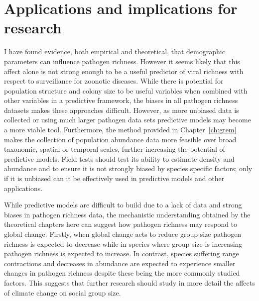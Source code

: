 




\section{Applications and implications for research}

I have found evidence, both empirical and theoretical, that demographic parameters can influence pathogen richness.
However it seems likely that this affect alone is not strong enough to be a useful predictor of viral richness with respect to surveillance for zoonotic diseases.
While there is potential for population structure and colony size to be useful variables when combined with other variables in a predictive framework, the biases in all pathogen richness datasets makes these approaches difficult.
However, as more unbiased data is collected \cite{anthony2013strategy, anthony2015non} or using much larger pathogen data sets \cite{wardeh2015database} predictive models may become a more viable tool.
Furthermore, the method provided in Chapter~\ref{ch:grem} makes the collection of population abundance data more feasible over broad taxonomic, spatial or temporal scales, further increasing the potential of predictive models.
Field tests should test its ability to estimate density and abundance and to ensure it is not strongly biased by species specific factors; only if it is unbiased can it be effectively used in predictive models and other applications.

While predictive models are difficult to build due to a lack of data and strong biases in pathogen richness data, the mechanistic understanding obtained by the theoretical chapters here can suggest how pathogen richness may respond to global change.
Firstly, when global change acts to reduce group size \cite{lehmann2010apes, zunino2007habitat, manor2003impact, atwood2006influence} pathogen richness is expected to decrease while in species where group size is increasing \cite{lehmann2010apes} pathogen richness is expected to increase.
In contrast, species suffering range contractions \cite{thomas2004extinction} and decreases in abundance \cite{craigie2010large} are expected to experience smaller changes in pathogen richness despite these being the more commonly studied factors.
This suggests that further research should study in more detail the affects of climate change on social group size.

